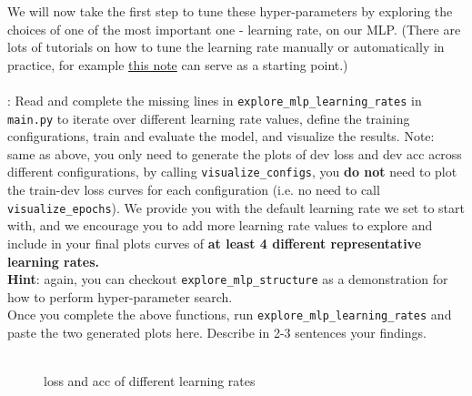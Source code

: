 We will now take the first step to tune these hyper-parameters by exploring the choices of one of the most important one - learning rate, on our MLP. (There are lots of tutorials on how to tune the learning rate manually or automatically in practice, for example \href{https://www.kaggle.com/code/residentmario/tuning-your-learning-rate}{this note} can serve as a starting point.)\\\\
\noindent\todo{}: Read and complete the missing lines in \texttt{explore\_mlp\_learning\_rates} in \texttt{main.py} to iterate over different learning rate values, define the training configurations, train and evaluate the model, and visualize the results. Note: same as above, you only need to generate the plots of dev loss and dev acc across different configurations, by calling \texttt{visualize\_configs}, you \textbf{do not} need to plot the train-dev loss curves for each configuration (i.e. no need to call \texttt{visualize\_epochs}). We provide you with the default learning rate we set to start with, and we encourage you to add more learning rate values to explore and include in your final plots curves of \textbf{at least 4 different representative learning rates.}\\
\noindent\textbf{Hint}: again, you can checkout \texttt{explore\_mlp\_structure} as a demonstration for how to perform hyper-parameter search.\\
Once you complete the above functions, run \texttt{explore\_mlp\_learning\_rates} and paste the two generated plots here. Describe in 2-3 sentences your findings.\\
\noindent {\color{red}{your plots and answer:}}\\
\begin{figure}[h] 
    \centering
    \hfill
    \caption{loss and acc of different learning rates}
\end{figure}\\

